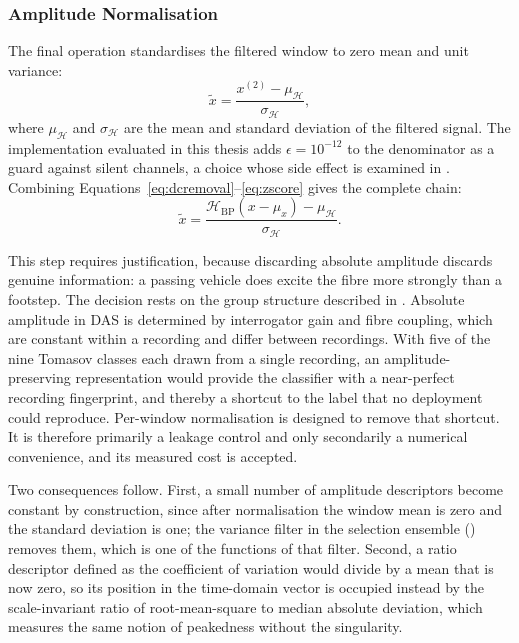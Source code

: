 \subsubsection{Amplitude Normalisation}
\label{sec:chap3Normalisation}
The final operation standardises the filtered window to zero mean and unit variance:
\begin{equation}
	\tilde{x} = \frac{x^{(2)} - \mu_{\mathcal{H}}}{\sigma_{\mathcal{H}}},
	\label{eq:zscore}
\end{equation}
where $\mu_{\mathcal{H}}$ and $\sigma_{\mathcal{H}}$ are the mean and standard deviation of the filtered signal. The implementation evaluated in this thesis adds $\epsilon = 10^{-12}$ to the denominator as a guard against silent channels, a choice whose side effect is examined in . Combining Equations~\eqref{eq:dcremoval}--\eqref{eq:zscore} gives the complete chain:
\begin{equation}
	\tilde{x} = \frac{\mathcal{H}_{\mathrm{BP}}(x - \mu_x) - \mu_{\mathcal{H}}}{\sigma_{\mathcal{H}}}.
	\label{eq:preprocess}
\end{equation}

This step requires justification, because discarding absolute amplitude discards genuine information: a passing vehicle does excite the fibre more strongly than a footstep. The decision rests on the group structure described in . Absolute amplitude in DAS is determined by interrogator gain and fibre coupling, which are constant within a recording and differ between recordings. With five of the nine Tomasov classes each drawn from a single recording, an amplitude-preserving representation would provide the classifier with a near-perfect recording fingerprint, and thereby a shortcut to the label that no deployment could reproduce. Per-window normalisation is designed to remove that shortcut. It is therefore primarily a leakage control and only secondarily a numerical convenience, and its measured cost is accepted.

Two consequences follow. First, a small number of amplitude descriptors become constant by construction, since after normalisation the window mean is zero and the standard deviation is one; the variance filter in the selection ensemble () removes them, which is one of the functions of that filter. Second, a ratio descriptor defined as the coefficient of variation would divide by a mean that is now zero, so its position in the time-domain vector is occupied instead by the scale-invariant ratio of root-mean-square to median absolute deviation, which measures the same notion of peakedness without the singularity.

